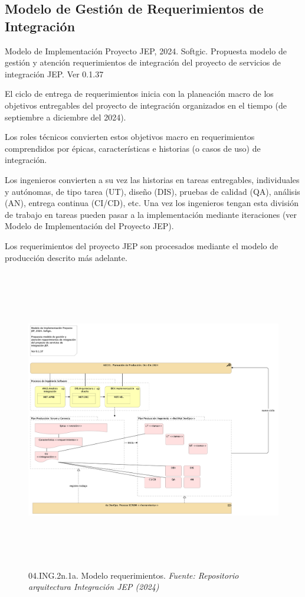 \documentclass[
  paper=a4,
  ,captions=tableheading
]{scrartcl}
\renewenvironment{quote}{\begin{customblockquote}\list{}{\rightmargin=0em\leftmargin=0em}%
\item\relax\color{blockquote-text}\ignorespaces}{\unskip\unskip\endlist\end{customblockquote}}
\begin{document}
\subsection{Modelo de Gestión de Requerimientos de
Integración}\label{sec:modelo-de-gestiuxf3n-de-requerimientos-de-integraciuxf3n}

\begin{quote}
Modelo de Implementación Proyecto JEP, 2024. Softgic. Propuesta modelo
de gestión y atención requerimientos de integración del proyecto de
servicios de integración JEP. Ver 0.1.37
\end{quote}

El ciclo de entrega de requerimientos inicia con la planeación macro de
los objetivos entregables del proyecto de integración organizados en el
tiempo (de septiembre a diciembre del 2024).

Los roles técnicos convierten estos objetivos macro en requerimientos
comprendidos por épicas, características e historias (o casos de uso) de
integración.

Los ingenieros convierten a su vez las historias en tareas entregables,
individuales y autónomas, de tipo tarea (UT), diseño (DIS), pruebas de
calidad (QA), análisis (AN), entrega continua (CI/CD), etc. Una vez los
ingenieros tengan esta división de trabajo en tareas pueden pasar a la
implementación mediante iteraciones (ver Modelo de Implementación del
Proyecto JEP).

Los requerimientos del proyecto JEP son procesados mediante el modelo de
producción descrito más adelante.

\begin{figure}
\centering
\includegraphics[width=\textwidth,height=5.20833in]{images/04.ING.2n.1a.Modelorequerimientos.png}
\caption{04.ING.2n.1a. Modelo requerimientos. \emph{Fuente: Repositorio
arquitectura Integración JEP
(2024)}}\label{fig:id-7c3abdaa8d9b46eebfd8f8e3e8d912ce}
\end{figure}
\end{document}
